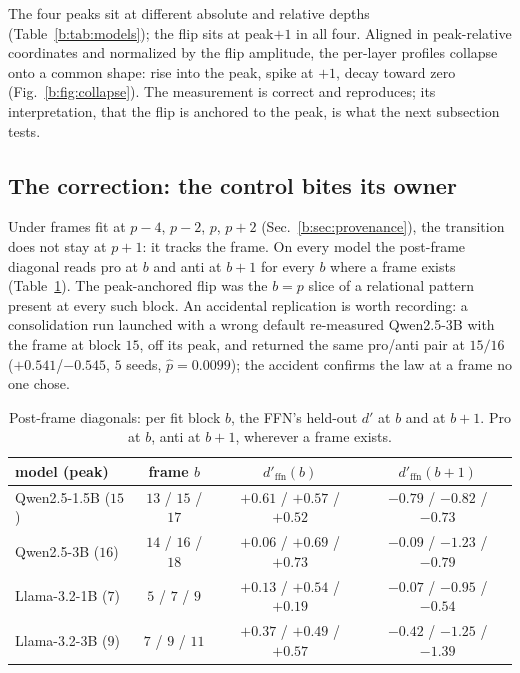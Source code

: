 \documentclass[11pt]{article}
\begin{document}
The four peaks sit at different absolute and relative depths
(Table~\ref{b:tab:models}); the flip sits at peak$+1$ in all four. Aligned in
peak-relative coordinates and normalized by the flip amplitude, the
per-layer profiles collapse onto a common shape: rise into the peak, spike
at $+1$, decay toward zero (Fig.~\ref{b:fig:collapse}). The measurement is
correct and reproduces; its interpretation, that the flip is anchored to
the peak, is what the next subsection tests.

\subsection{The correction: the control bites its owner}
\label{b:sec:correction}

Under frames fit at $p{-}4$, $p{-}2$, $p$, $p{+}2$
(Sec.~\ref{b:sec:provenance}), the transition does not stay at $p{+}1$: it
tracks the frame. On every model the post-frame diagonal reads pro at $b$
and anti at $b{+}1$ for every $b$ where a frame exists
(Table~\ref{b:tab:post}). The peak-anchored flip was the $b{=}p$ slice of a
relational pattern present at every such block. An accidental replication
is worth recording: a consolidation run launched with a wrong default
re-measured Qwen2.5-3B with the frame at block $15$, off its peak, and
returned the same pro/anti pair at $15/16$ ($+0.541$/$-0.545$, $5$ seeds,
$\hat p = 0.0099$); the accident confirms the law at a frame no one chose.

\begin{table}[H]
\centering
\caption{Post-frame diagonals: per fit block $b$, the FFN's held-out $d'$
at $b$ and at $b{+}1$. Pro at $b$, anti at $b{+}1$, wherever a frame
exists.}
\label{b:tab:post}
\begin{tabular}{lccc}
\toprule
model (peak) & frame $b$ & $d'_{\mathrm{ffn}}(b)$ & $d'_{\mathrm{ffn}}(b{+}1)$ \\
\midrule
Qwen2.5-1.5B ($15$) & $13$ / $15$ / $17$ & $+0.61$ / $+0.57$ / $+0.52$ & $-0.79$ / $-0.82$ / $-0.73$ \\
Qwen2.5-3B ($16$)   & $14$ / $16$ / $18$ & $+0.06$ / $+0.69$ / $+0.73$ & $-0.09$ / $-1.23$ / $-0.79$ \\
Llama-3.2-1B ($7$)  & $5$ / $7$ / $9$    & $+0.13$ / $+0.54$ / $+0.19$ & $-0.07$ / $-0.95$ / $-0.54$ \\
Llama-3.2-3B ($9$)  & $7$ / $9$ / $11$   & $+0.37$ / $+0.49$ / $+0.57$ & $-0.42$ / $-1.25$ / $-1.39$ \\
\bottomrule
\end{tabular}
\end{table}
\end{document}
